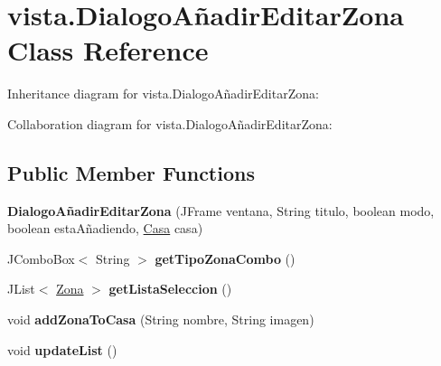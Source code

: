 \hypertarget{classvista_1_1_dialogo_a_xC3_xB1adir_editar_zona}{}\section{vista.\+Dialogo\+Añadir\+Editar\+Zona Class Reference}
\label{classvista_1_1_dialogo_a_xC3_xB1adir_editar_zona}


Inheritance diagram for vista.\+Dialogo\+Añadir\+Editar\+Zona\+:


Collaboration diagram for vista.\+Dialogo\+Añadir\+Editar\+Zona\+:
\subsection*{Public Member Functions}
\begin{DoxyCompactItemize}
\item 
\mbox{\label{classvista_1_1_dialogo_a_xC3_xB1adir_editar_zona_a334c1d2bbdfd703144f614e5b17cd5a7}} 
{\bfseries Dialogo\+Añadir\+Editar\+Zona} (J\+Frame ventana, String titulo, boolean modo, boolean esta\+Añadiendo, \mbox{\hyperlink{classmodelo_1_1_casa}{Casa}} casa)
\item 
\mbox{\label{classvista_1_1_dialogo_a_xC3_xB1adir_editar_zona_a0d49235e9285853b6cc0a786b7068a3a}} 
J\+Combo\+Box$<$ String $>$ {\bfseries get\+Tipo\+Zona\+Combo} ()
\item 
\mbox{\label{classvista_1_1_dialogo_a_xC3_xB1adir_editar_zona_a996c5821e4f9c2abbc6e89be634434a7}} 
J\+List$<$ \mbox{\hyperlink{classmodelo_1_1_zona}{Zona}} $>$ {\bfseries get\+Lista\+Seleccion} ()
\item 
\mbox{\label{classvista_1_1_dialogo_a_xC3_xB1adir_editar_zona_ad6de9a76fc2e11bdf48dca18e82f3e81}} 
void {\bfseries add\+Zona\+To\+Casa} (String nombre, String imagen)
\item 
\mbox{\label{classvista_1_1_dialogo_a_xC3_xB1adir_editar_zona_a371fa7858769811260180c8774cf73b3}} 
void {\bfseries update\+List} ()
\item 

\end{DoxyCompactItemize}

